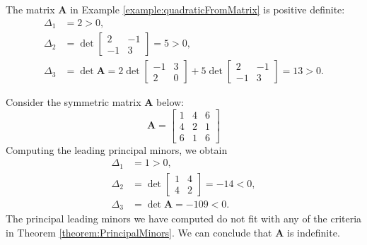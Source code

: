\begin{example}
The matrix $\boldsymbol{A}$ in Example \ref{example:quadraticFromMatrix} is positive definite:
\begin{align*}
\Delta_1 &= 2 > 0, \\
\Delta_2 &= \det \begin{bmatrix} 2 & -1 \\ -1 & 3 \end{bmatrix} = 5 > 0, \\
\Delta_3 &= \det \boldsymbol{A} = 2 \det \begin{bmatrix} -1 & 3 \\ 2 & 0 \end{bmatrix} + 5 \det \begin{bmatrix} 2 & -1 \\ -1 & 3 \end{bmatrix} = 13 >0.
\end{align*}
\end{example}

\begin{example}
Consider the symmetric matrix $\boldsymbol{A}$ below:
\begin{equation*}
\boldsymbol{A} = \begin{bmatrix} 1 & 4 & 6 \\ 4 & 2 & 1 \\ 6 & 1 & 6 \end{bmatrix}
\end{equation*}
Computing the leading principal minors, we obtain
\begin{align*}
\Delta_1 &= 1 > 0, \\
\Delta_2 &= \det \begin{bmatrix} 1 & 4 \\ 4 & 2 \end{bmatrix} = -14 <0, \\
\Delta_3 &= \det \boldsymbol{A} = -109 < 0.
\end{align*}
The principal leading minors we have computed do not fit with any of the criteria in Theorem \ref{theorem:PrincipalMinors}.  We can conclude that $\boldsymbol{A}$ is indefinite.
\end{example}

